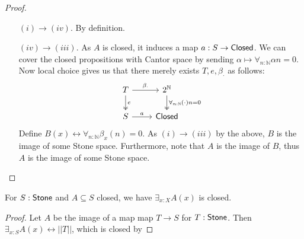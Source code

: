 \begin{proof}
\begin{itemize}
%
%
%
%
%
%
   \item [$(i) \to (iv)$.] By definition.
   \item[$(iv) \to (iii)$.]
     As $A$ is closed, it induces a map $a:S\to \mathsf{Closed}$. 
     We can cover the closed propositions with Cantor space
     by sending 
     $\alpha \mapsto \forall_{n:\mathbb N} \alpha n = 0.$
     Now local choice gives us that there merely exists $T, e, \beta_\cdot$ as follows:
     \begin{equation}
       \begin{tikzcd}
         T \arrow[r,"\beta_\cdot"] \arrow[d, two heads,"e"] & 2^\mathbb N 
         \arrow[d,two heads, "\forall_{n:\mathbb N} (\cdot)n = 0"] \\
         S \arrow[r,"a"] & \Closed
       \end{tikzcd} 
     \end{equation} 
     Define $B(x) \leftrightarrow \forall_{n:\mathbb N} \beta_x(n) = 0$. 
     As $(i) \to (iii)$ by the above, $B$ is the image of some Stone space. 
     Furthermore, note that $A$ is the image of $B$, thus $A$ is the image of some Stone space. 
\end{itemize} 
\end{proof} 


\begin{corollary}\label{InhabitedClosedSubSpaceClosed}
  For $S:\mathsf{Stone}$ and $A\subseteq S$ closed, we have 
  $\exists_{x:X} A(x)$ is closed. 
\end{corollary}
\begin{proof}
  Let $A$ be the image of a map map $T\to S$ for $T:\mathsf{Stone}$. 
  Then $\exists_{x:S} A(x) \leftrightarrow ||T||$, which is closed by 
\end{proof}

